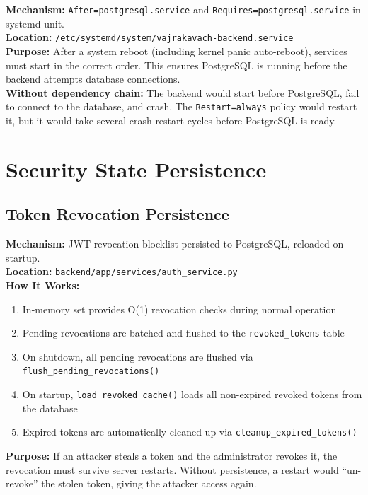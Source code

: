 \documentclass[11pt,a4paper]{article}
\begin{document}
\begin{tcolorbox}[colback=recoveryblue!5, colframe=recoveryblue]
\textbf{Mechanism:} \texttt{After=postgresql.service} and \texttt{Requires=postgresql.service} in systemd unit.\\
\textbf{Location:} \texttt{/etc/systemd/system/vajrakavach-backend.service}\\
\textbf{Purpose:} After a system reboot (including kernel panic auto-reboot), services must start in the correct order. This ensures PostgreSQL is running before the backend attempts database connections.\\
\textbf{Without dependency chain:} The backend would start before PostgreSQL, fail to connect to the database, and crash. The \texttt{Restart=always} policy would restart it, but it would take several crash-restart cycles before PostgreSQL is ready.
\end{tcolorbox}

\section{Security State Persistence}

\subsection{Token Revocation Persistence}

\begin{tcolorbox}[colback=recoveryblue!5, colframe=recoveryblue]
\textbf{Mechanism:} JWT revocation blocklist persisted to PostgreSQL, reloaded on startup.\\
\textbf{Location:} \texttt{backend/app/services/auth\_service.py}\\
\textbf{How It Works:}
\begin{enumerate}[nosep]
  \item In-memory set provides O(1) revocation checks during normal operation
  \item Pending revocations are batched and flushed to the \texttt{revoked\_tokens} table
  \item On shutdown, all pending revocations are flushed via \texttt{flush\_pending\_revocations()}
  \item On startup, \texttt{load\_revoked\_cache()} loads all non-expired revoked tokens from the database
  \item Expired tokens are automatically cleaned up via \texttt{cleanup\_expired\_tokens()}
\end{enumerate}
\textbf{Purpose:} If an attacker steals a token and the administrator revokes it, the revocation must survive server restarts. Without persistence, a restart would ``un-revoke'' the stolen token, giving the attacker access again.
\end{tcolorbox}
\end{document}
